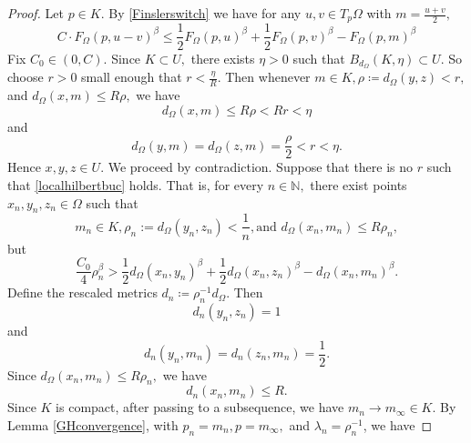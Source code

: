 \documentclass[letterpaper, 11pt, reqno]{amsart}
\theoremstyle{definition}
\begin{document}
\begin{proof}
    Let $p \in K$. By \ref{Finslerswitch} we have for any $u,v \in T_p\Omega$ with $m=\frac{u+v}{2},$
    \begin{equation}\label{Finslerineq}
        C\cdot F_\Omega(p,u-v)^\beta \leq \frac{1}{2}F_\Omega(p,u)^\beta + \frac{1}{2}F_\Omega(p,v)^\beta - F_\Omega(p,m)^\beta
    \end{equation}
    Fix $C_0 \in (0,C).$ Since $K \subset U,$ there exists $\eta>0$ such that $B_{d_\Omega}(K,\eta) \subset U$. So choose $r>0$ small enough that $r < \frac{\eta}{R}$. Then whenever $m \in K, \rho \coloneq d_\Omega(y,z) < r,$ and $d_\Omega(x,m) \leq R\rho,$ we have
    \begin{equation}
        d_\Omega(x,m) \leq R\rho < Rr < \eta
    \end{equation}
    and
    \begin{equation}
        d_\Omega(y,m)=d_\Omega(z,m)=\frac{\rho}{2} < r <\eta.
    \end{equation}
    Hence $x,y,z \in U$.
    We proceed by contradiction. Suppose that there is no $r$ such that \ref{localhilbertbuc} holds. That is, for every $n \in \mathbb{N},$ there exist points $x_n,y_n,z_n \in \Omega$ such that 
    \begin{equation}
     m_n \in K, \rho_n := d_\Omega(y_n,z_n) < \frac{1}{n}, \text{and } d_\Omega(x_n,m_n) \leq R\rho_n,   
    \end{equation} but
    \begin{equation}\label{contradiction ineq}
      \frac{C_0}{4}\rho_n^\beta > \frac{1}{2}d_\Omega(x_n,y_n)^\beta +
\frac{1}{2}d_\Omega(x_n,z_n)^\beta  - d_\Omega(x_n,m_n)^\beta .
    \end{equation}
     Define the rescaled metrics $d_n \coloneq \rho_n^{-1}d_\Omega.$ Then
    \begin{equation}\label{oppsideone}
        d_n(y_n,z_n) = 1
    \end{equation}
    and
    \begin{equation}\label{midpointsequences}
        d_n(y_n,m_n) = d_n(z_n,m_n) = \frac{1}{2}.
    \end{equation}
    Since $d_\Omega(x_n,m_n) \leq R\rho_n,$ we have
    \begin{equation}\label{altitudebounded}
        d_n(x_n,m_n) \leq R.
    \end{equation}
    Since $K$ is compact, after passing to a subsequence, we have $m_n \longrightarrow m_\infty \in K$. By Lemma \ref{GHconvergence}, with $p_n = m_n, p=m_\infty,$ and $\lambda_n = \rho_n^{-1}$, we have

\end{proof}
\end{document}
